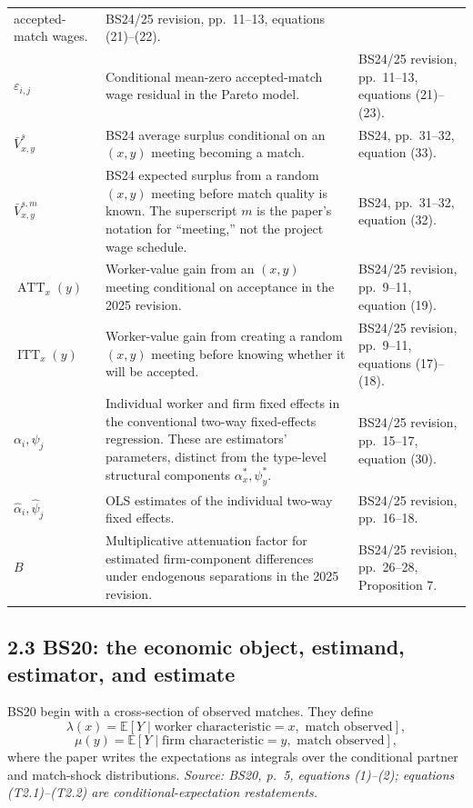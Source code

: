 \documentclass[11pt]{article}
\begin{document}
\begin{longtable}{p{}p{}p{}}
accepted-match wages. & BS24/25 revision, pp.\ 11--13,
equations (21)--(22). \\
\(\varepsilon_{i,j}\) & Conditional mean-zero accepted-match wage residual in
the Pareto model. & BS24/25 revision, pp.\ 11--13,
equations (21)--(23). \\
\(\bar V^s_{x,y}\) & BS24 average surplus conditional on an \((x,y)\) meeting
becoming a match. & BS24, pp.\ 31--32, equation (33). \\
\(\bar V^{s,m}_{x,y}\) & BS24 expected surplus from a random \((x,y)\)
meeting before match quality is known.  The superscript \(m\) is the paper's
notation for ``meeting,'' not the project wage schedule. & BS24, pp.\ 31--32,
equation (32). \\
\(\operatorname{ATT}_x(y)\) & Worker-value gain from an \((x,y)\) meeting
conditional on acceptance in the 2025 revision. & BS24/25 revision,
pp.\ 9--11, equation (19). \\
\(\operatorname{ITT}_x(y)\) & Worker-value gain from creating a random
\((x,y)\) meeting before knowing whether it will be accepted. & BS24/25
revision, pp.\ 9--11, equations (17)--(18). \\
\(\alpha_i,\psi_j\) & Individual worker and firm fixed effects in the
conventional two-way fixed-effects regression.  These are estimators'
parameters, distinct from the type-level structural components
\(\alpha_x^*,\psi_y^*\). & BS24/25 revision, pp.\ 15--17,
equation (30). \\
\(\widehat\alpha_i,\widehat\psi_j\) & OLS estimates of the individual
two-way fixed effects. & BS24/25 revision, pp.\ 16--18. \\
\(B\) & Multiplicative attenuation factor for estimated firm-component
differences under endogenous separations in the 2025 revision. & BS24/25
revision, pp.\ 26--28, Proposition 7. \\
\end{longtable}

\subsection{2.3 BS20: the economic object, estimand, estimator, and estimate}

BS20 begin with a cross-section of observed matches.  They define
\[
\lambda(x)
=
\mathbb E[Y\mid \text{worker characteristic}=x,\text{ match observed}],
\tag{T2.1}
\]
\[
\mu(y)
=
\mathbb E[Y\mid \text{firm characteristic}=y,\text{ match observed}],
\tag{T2.2}
\]
where the paper writes the expectations as integrals over the conditional
partner and match-shock distributions.  \textit{Source: BS20, p.\ 5,
equations (1)--(2); equations (T2.1)--(T2.2) are conditional-expectation
restatements.}
\end{document}
